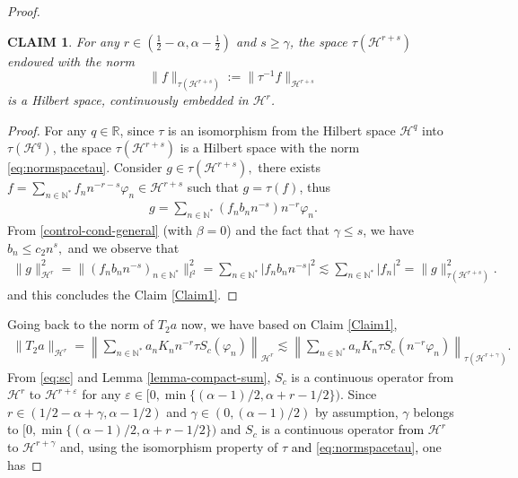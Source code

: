 \documentclass[11pt, dvipsnames]{amsart}
\newtheorem{claim}[theorem]{CLAIM}
\begin{document}
\begin{proof}
\begin{claim}
    For any $r\in \left(\frac{1}{2}-\alpha,\alpha-\frac{1}{2}\right)$ and $s\geq \gamma$, the space $\tau(\mathcal{H}^{r+s})$ endowed with the norm
    \begin{equation}
    \label{eq:normspacetau}
        \|f\|_{\tau(\mathcal{H}^{r+s})} := \|\tau^{-1}f\|_{\mathcal{H}^{r+s}}
    \end{equation}
    is a Hilbert space, continuously embedded in $\mathcal{H}^{r}$.
\end{claim}
\begin{proof}
For any $q\in\mathbb{R}$, since $\tau$ is an isomorphism from the Hilbert space $\mathcal{H}^{q}$ into $\tau(\mathcal{H}^{q})$, the space $\tau(\mathcal{H}^{r+s})$ is a Hilbert space with the norm \eqref{eq:normspacetau}. Consider $g\in \tau(\mathcal{H}^{r+s}),$ there exists $f=\displaystyle\sum_{n\in \mathbb{N}^*}f_n n^{-r-s}\varphi_n\in \mathcal{H}^{r+s}$ such that $g=\tau(f)$, thus
\begin{align*}
    g
    =\sum_{n\in \mathbb{N}^*}(f_n b_n n^{-s}) n^{-r}\varphi_n.
\end{align*}
From \eqref{control-cond-general} (with $\beta=0$) and the fact that $\gamma\leq s$, we have $b_n
\leq c_2 n^{s},$ and we observe that
\begin{align*}
    \|g\|^2_{\mathcal{H}^r}=\|(f_n b_n n^{-s})_{n\in \mathbb{N}^*}\|^2_{l^2}=\sum_{n\in \mathbb{N}^*}|f_n b_n n^{-s}|^2\lesssim \sum_{n\in \mathbb{N}^*}|f_n|^2=\|g\|^2_{\tau(\mathcal{H}^{r+s})}.
\end{align*} 
and this concludes the Claim \ref{Claim1}.
\end{proof}
Going back to the norm of $T_2a$ now, we have
based on Claim \ref{Claim1}, 
\begin{align*}
\|T_2a\|_{\mathcal{H}^r}=\left\|\sum_{n\in \mathbb{N}^*}a_n K_n n^{-r}\tau S_c(\varphi_n)\right\|_{\mathcal{H}^r}\lesssim \left\|\sum_{n\in \mathbb{N}^*}a_n K_n \tau S_c(n^{-r}\varphi_n)\right\|_{\tau(\mathcal{H}^{r+\gamma})}.
\end{align*}
From \eqref{eq:sc} and Lemma \ref{lemma-compact-sum},  $S_c$ is a continuous operator from $\mathcal{H}^{r}$ to $\mathcal{H}^{r+\varepsilon}$ for any $\varepsilon\in[0,\min\{(\alpha-1)/2,\alpha+r-1/2\})$. Since $r\in(1/2-\alpha+\gamma, \alpha-1/2)$ and $\gamma\in(0,(\alpha-1)/2)$ by assumption, $\gamma$ belongs to $[0,\min\{(\alpha-1)/2,\alpha+r-1/2\})$ and $S_{c}$ is a continuous operator \textcolor{black}{from} $\mathcal{H}^{r}$ to $\mathcal{H}^{r+\gamma}$ and, using the isomorphism property of $\tau$ \textcolor{black}{and \eqref{eq:normspacetau},} one has

\end{proof}
\end{document}
